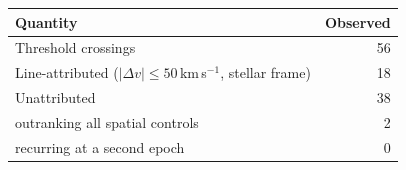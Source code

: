 \begin{tabular}{@{}lr@{}}
\hline
Quantity & Observed \\
\hline
Threshold crossings & 56 \\
Line-attributed ($|\Delta v|\leq50$\,km\,s$^{-1}$, stellar frame) & 18 \\
Unattributed & 38 \\
\quad outranking all spatial controls & 2 \\
\quad recurring at a second epoch & 0 \\
\hline
\end{tabular}
